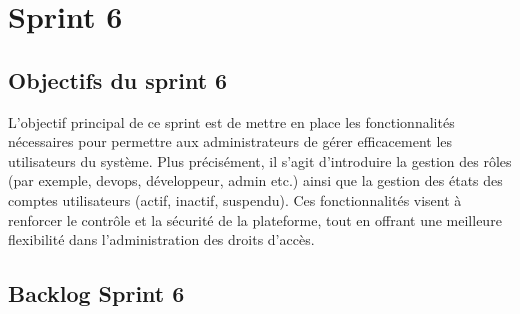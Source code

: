 \section{Sprint 6}
\subsection{Objectifs du sprint 6}

L’objectif principal de ce sprint est de mettre en place les fonctionnalités nécessaires pour permettre aux administrateurs de gérer efficacement les utilisateurs du système. 
Plus précisément, il s’agit d’introduire la gestion des rôles (par exemple, devops, développeur, admin etc.) ainsi que la gestion des états des comptes utilisateurs 
(actif, inactif, suspendu). Ces fonctionnalités visent à renforcer le contrôle et la sécurité de la plateforme, tout en offrant une meilleure flexibilité dans 
l’administration des droits d’accès.

\subsection{Backlog Sprint 6}

\begin{table}[H]
\centering
\renewcommand{\arraystretch}{1.4}

\captionsetup{justification=centering}
\caption{Backlog Sprint 6}
\end{table}

